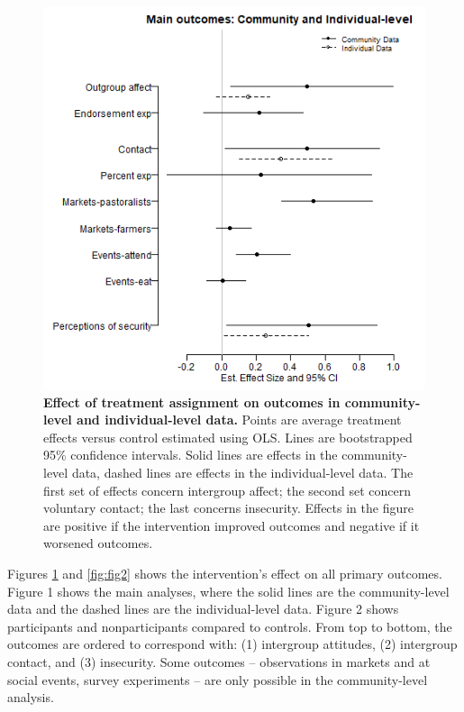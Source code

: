 \documentclass[11pt]{article}
\begin{document}
\begin{figure}[H]
\centering
\includegraphics[width=.7\textwidth]{../../../figs/ecpn_coefplots_MainOuts-cats.png}
\caption{\label{fig:fig1} \textbf{Effect of treatment assignment on outcomes in community-level and individual-level data.} Points are average treatment effects versus control estimated using OLS. Lines are bootstrapped 95\% confidence intervals.  Solid lines are effects in the community-level data, dashed lines are effects in the individual-level data.  The first set of effects concern intergroup affect; the second set concern voluntary contact; the last concerns insecurity.  Effects in the figure are positive if the intervention improved outcomes and negative if it worsened outcomes.}
\end{figure}

Figures \ref{fig:fig1} and \ref{fig:fig2} shows the intervention's
effect on all primary outcomes. Figure 1 shows the main analyses, where
the solid lines are the community-level data and the dashed lines are
the individual-level data. Figure 2 shows participants and
nonparticipants compared to controls. From top to bottom, the outcomes
are ordered to correspond with: (1) intergroup attitudes, (2) intergroup
contact, and (3) insecurity. Some outcomes -- observations in markets
and at social events, survey experiments -- are only possible in the
community-level analysis.
\end{document}
